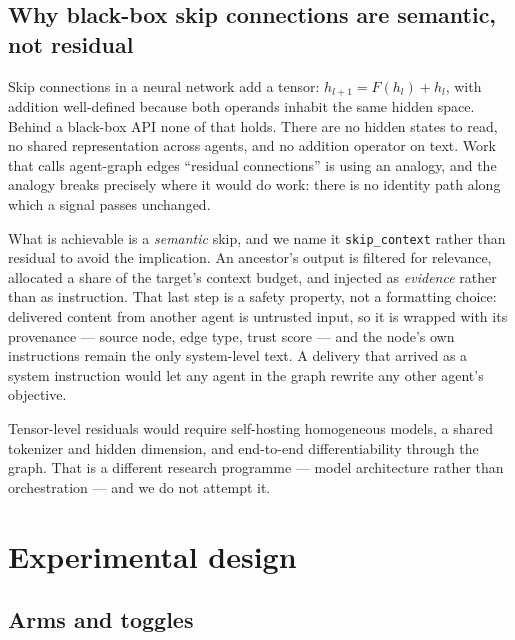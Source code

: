 \documentclass[10pt]{article}
\begin{document}
\subsection{Why black-box skip connections are semantic, not residual}

Skip connections in a neural network add a tensor: $h_{l+1} = F(h_l) + h_l$,
with addition well-defined because both operands inhabit the same hidden space.
Behind a black-box API none of that holds. There are no hidden states to read,
no shared representation across agents, and no addition operator on text. Work
that calls agent-graph edges ``residual connections'' is using an analogy, and
the analogy breaks precisely where it would do work: there is no identity path
along which a signal passes unchanged.

What is achievable is a \emph{semantic} skip, and we name it \texttt{skip\_context}
rather than residual to avoid the implication. An ancestor's output is filtered
for relevance, allocated a share of the target's context budget, and injected
as \emph{evidence} rather than as instruction. That last step is a safety
property, not a formatting choice: delivered content from another agent is
untrusted input, so it is wrapped with its provenance --- source node, edge type,
trust score --- and the node's own instructions remain the only system-level
text. A delivery that arrived as a system instruction would let any agent in the
graph rewrite any other agent's objective.

Tensor-level residuals would require self-hosting homogeneous models, a shared
tokenizer and hidden dimension, and end-to-end differentiability through the
graph. That is a different research programme --- model architecture rather than
orchestration --- and we do not attempt it.

\section{Experimental design}
\label{sec:design}

\subsection{Arms and toggles}
\end{document}
